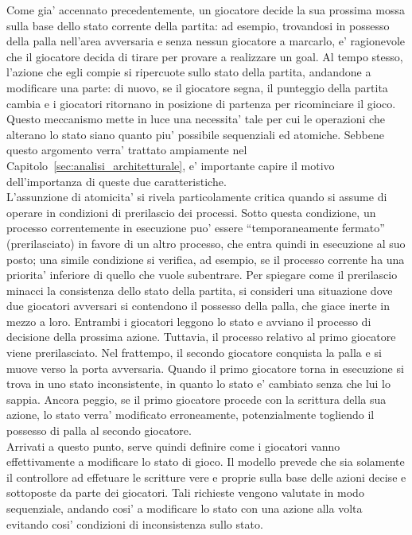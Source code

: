 Come gia' accennato precedentemente, un giocatore decide la sua prossima mossa sulla base dello stato corrente della partita: ad esempio, trovandosi in possesso della palla nell'area avversaria e senza nessun giocatore a marcarlo, e' ragionevole che il giocatore decida di tirare per provare a realizzare un goal. Al tempo stesso, l'azione che egli compie si ripercuote sullo stato della partita, andandone a modificare una parte: di nuovo, se il giocatore segna, il punteggio della partita cambia e i giocatori ritornano in posizione di partenza per ricominciare il gioco. Questo meccanismo mette in luce una necessita' tale per cui le operazioni che alterano lo stato siano quanto piu' possibile sequenziali ed atomiche. Sebbene questo argomento verra' trattato ampiamente nel Capitolo~\ref{sec:analisi_architetturale}, e' importante capire il motivo dell'importanza di queste due caratteristiche.\\

L'assunzione di atomicita' si rivela particolamente critica quando si assume di operare in condizioni di prerilascio dei processi. Sotto questa condizione, un processo correntemente in esecuzione puo' essere ``temporaneamente fermato'' (prerilasciato) in favore di un altro processo, che entra quindi in esecuzione al suo posto; una simile condizione si verifica, ad esempio, se il processo corrente ha una priorita' inferiore di quello che vuole subentrare. Per spiegare come il prerilascio minacci la consistenza dello stato della partita, si consideri una situazione dove due giocatori avversari si contendono il possesso della palla, che giace inerte in mezzo a loro. Entrambi i giocatori leggono lo stato e avviano il processo di decisione della prossima azione. Tuttavia, il processo relativo al primo giocatore viene prerilasciato. Nel frattempo, il secondo giocatore conquista la palla e si muove verso la porta avversaria. Quando il primo giocatore torna in esecuzione si trova in uno stato inconsistente, in quanto lo stato e' cambiato senza che lui lo sappia. Ancora peggio, se il primo giocatore procede con la scrittura della sua azione, lo stato verra' modificato erroneamente, potenzialmente togliendo il possesso di palla al secondo giocatore.\\

Arrivati a questo punto, serve quindi definire come i giocatori vanno effettivamente a modificare lo stato di gioco. Il modello prevede che sia solamente il controllore ad effetuare le scritture vere e proprie sulla base delle azioni decise e sottoposte da parte dei giocatori. Tali richieste vengono valutate in modo sequenziale, andando cosi' a modificare lo stato con una azione alla volta evitando cosi' condizioni di inconsistenza sullo stato.\\

